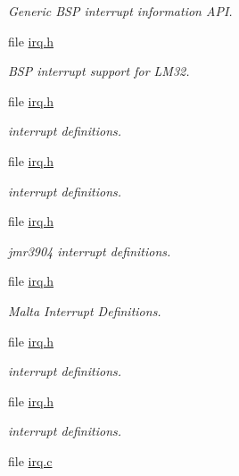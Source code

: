 \begin{DoxyCompactItemize}
\begin{DoxyCompactList}\small\item\em Generic B\+SP interrupt information A\+PI. \end{DoxyCompactList}\item 
file \mbox{\hyperlink{bsps_2lm32_2include_2bsp_2irq_8h}{irq.\+h}}
\begin{DoxyCompactList}\small\item\em B\+SP interrupt support for L\+M32. \end{DoxyCompactList}\item 
file \mbox{\hyperlink{bsps_2mips_2csb350_2include_2bsp_2irq_8h}{irq.\+h}}
\begin{DoxyCompactList}\small\item\em interrupt definitions. \end{DoxyCompactList}\item 
file \mbox{\hyperlink{bsps_2mips_2hurricane_2include_2bsp_2irq_8h}{irq.\+h}}
\begin{DoxyCompactList}\small\item\em interrupt definitions. \end{DoxyCompactList}\item 
file \mbox{\hyperlink{bsps_2mips_2jmr3904_2include_2bsp_2irq_8h}{irq.\+h}}
\begin{DoxyCompactList}\small\item\em jmr3904 interrupt definitions. \end{DoxyCompactList}\item 
file \mbox{\hyperlink{bsps_2mips_2malta_2include_2bsp_2irq_8h}{irq.\+h}}
\begin{DoxyCompactList}\small\item\em Malta Interrupt Definitions. \end{DoxyCompactList}\item 
file \mbox{\hyperlink{bsps_2mips_2rbtx4925_2include_2bsp_2irq_8h}{irq.\+h}}
\begin{DoxyCompactList}\small\item\em interrupt definitions. \end{DoxyCompactList}\item 
file \mbox{\hyperlink{bsps_2mips_2rbtx4938_2include_2bsp_2irq_8h}{irq.\+h}}
\begin{DoxyCompactList}\small\item\em interrupt definitions. \end{DoxyCompactList}\item 
file \mbox{\hyperlink{bsps_2mips_2shared_2irq_2irq_8c}{irq.\+c}}

\end{DoxyCompactItemize}
